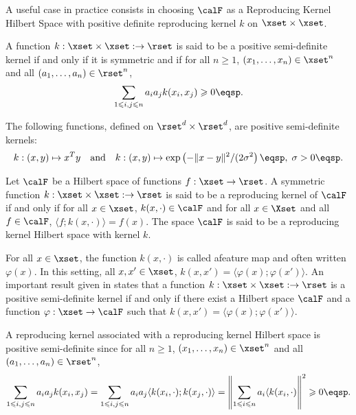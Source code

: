 A useful case in practice consists in choosing $\calF$ as a Reproducing Kernel Hilbert Space with positive definite reproducing kernel $k$ on $\xset\times \xset$.

\begin{shaded}
\begin{definition}
\label{def:kernel}
A function $k:\xset\times\xset:\to \rset$ is said to be a positive semi-definite kernel if and only if it is symmetric and if for all $n\geqslant 1$, $(x_1,\ldots,x_n)\in\xset^n$ and all $(a_1,\ldots,a_n)\in\rset^n$,
\[
\sum_{1\leqslant i,j\leqslant n}a_ia_jk(x_i,x_j) \geqslant 0\eqsp.
\]
\end{definition}
\end{shaded}

\begin{remark}
The following functions, defined on $\rset^d\times\rset^d$, are positive semi-definite kernels:
$$
k:(x,y)\mapsto x^Ty \quad\mathrm{and}\quad k:(x,y)\mapsto \mathrm{exp}\left(-\|x-y\|^2/(2\sigma^2\right)\eqsp,\; \sigma>0\eqsp.
$$
\end{remark}

\begin{shaded}
\begin{definition}
Let $\calF$ be a Hilbert space of functions $f:\xset\to\rset$. A symmetric function $k:\xset\times\xset:\to \rset$ is said to be a reproducing kernel of $\calF$ if and only if for all $x\in\xset$, $k(x,\cdot)\in\calF$ and for all $x\in\Xset$ and all $f\in\calF$, $\langle f; k(x,\cdot)\rangle = f(x)$. The space $\calF$ is said to be a reproducing kernel Hilbert space with kernel $k$.
\end{definition}
\end{shaded}

\begin{remark}
For all $x\in\xset$, the function $k(x,\cdot)$ is called afeature map and often written $\varphi(x)$. In this setting, all $x,x'\in\xset$, $k(x,x') = \langle \varphi(x); \varphi(x')\rangle$. An important result given in \cite{} states that  a function $k:\xset\times\xset:\to \rset$ is a positive semi-definite kernel if and only if there exist a Hilbert space $\calF$ and a function $\varphi: \xset\to \calF$ such that $k(x,x') = \langle \varphi(x); \varphi(x')\rangle$.
\end{remark}

A reproducing kernel associated with a reproducing kernel Hilbert space is positive semi-definite since for all $n\geqslant 1$, $(x_1,\ldots,x_n)\in\xset^n$ and all $(a_1,\ldots,a_n)\in\rset^n$,
\[
\sum_{1\leqslant i,j\leqslant n}a_ia_jk(x_i,x_j) = \sum_{1\leqslant i,j\leqslant n}a_ia_j \langle k(x_i,\cdot);k(x_j,\cdot)\rangle = \left\|\sum_{1\leqslant i\leqslant n}a_i\langle k(x_i,\cdot)\right\|^2 \geqslant 0\eqsp.
\]


